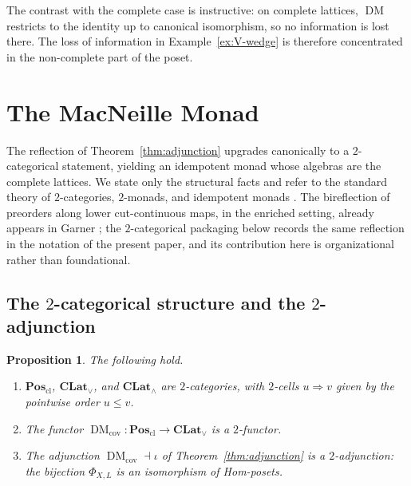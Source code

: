 \documentclass{amsart}
\theoremstyle{plain}
\newtheorem{proposition}{Proposition}[section]
\theoremstyle{definition}
\theoremstyle{remark}
\DeclareMathOperator{\DM}{DM}
\begin{document}
The contrast with the complete case is instructive: on complete lattices, $\DM$ restricts to the identity up to canonical isomorphism, so no information is lost there. The loss of information in Example~\ref{ex:V-wedge} is therefore concentrated in the non-complete part of the poset.

\section{The MacNeille Monad}\label{sec:monad}

The reflection of Theorem~\ref{thm:adjunction} upgrades canonically to a $2$-categorical statement, yielding an idempotent monad whose algebras are the complete lattices. We state only the structural facts and refer to the standard theory of $2$-categories, $2$-monads, and idempotent monads \cite{lack2010two,blackwell1989two,borceux1994handbook}. The bireflection of preorders along lower cut-continuous maps, in the enriched setting, already appears in Garner \cite{garner2014topological}; the $2$-categorical packaging below records the same reflection in the notation of the present paper, and its contribution here is organizational rather than foundational.

\subsection{The $2$-categorical structure and the $2$-adjunction}

\begin{proposition}\label{prop:macneille-2-structure}
The following hold.
\begin{enumerate}
\item $\mathbf{Pos}_{\mathrm{cl}}$, $\mathbf{CLat}_\vee$, and $\mathbf{CLat}_\wedge$ are $2$-categories, with $2$-cells $u\Rightarrow v$ given by the pointwise order $u\leq v$.
\item The functor $\DM_{\mathrm{cov}}\colon\mathbf{Pos}_{\mathrm{cl}}\to\mathbf{CLat}_\vee$ is a $2$-functor.
\item The adjunction $\DM_{\mathrm{cov}}\dashv\iota$ of Theorem~\ref{thm:adjunction} is a $2$-adjunction: the bijection $\Phi_{X,L}$ is an isomorphism of Hom-posets.
\end{enumerate}
\end{proposition}
\end{document}
